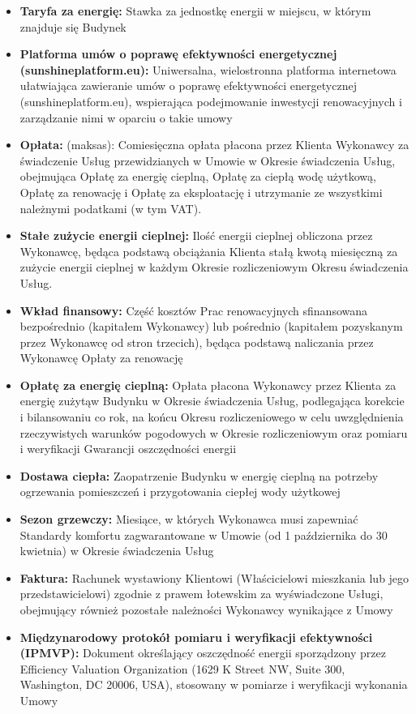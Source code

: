 \begin{multicols}{2}
\begin{itemize}[label={}]
	\item\textbf{Taryfa za energię:} Stawka za jednostkę energii w miejscu, w którym znajduje się Budynek
	\item\textbf{Platforma umów o poprawę efektywności energetycznej (sunshineplatform.eu):} Uniwersalna, wielostronna platforma internetowa ułatwiająca zawieranie umów o poprawę efektywności energetycznej (sunshineplatform.eu), wspierająca podejmowanie inwestycji renowacyjnych i zarządzanie nimi w oparciu o takie umowy
	\item\textbf{Opłata:} (maksas): Comiesięczna opłata płacona przez Klienta Wykonawcy za świadczenie Usług przewidzianych w Umowie w Okresie świadczenia Usług, obejmująca Opłatę za energię cieplną, Opłatę za ciepłą wodę użytkową, Opłatę za renowację i Opłatę za eksploatację i utrzymanie ze wszystkimi należnymi podatkami (w tym VAT).
	\item\textbf{Stałe zużycie energii cieplnej:} Ilość energii cieplnej obliczona przez Wykonawcę, będąca podstawą obciążania Klienta stałą kwotą miesięczną za zużycie energii cieplnej w każdym Okresie rozliczeniowym Okresu świadczenia Usług.
	\item\textbf{Wkład finansowy:} Część kosztów Prac renowacyjnych sfinansowana bezpośrednio (kapitałem Wykonawcy) lub pośrednio (kapitałem pozyskanym przez Wykonawcę od stron trzecich), będąca podstawą naliczania przez Wykonawcę Opłaty za renowację
	\item\textbf{Opłatę za energię cieplną:} Opłata płacona Wykonawcy przez Klienta za energię zużytąw Budynku w Okresie świadczenia Usług, podlegająca korekcie i bilansowaniu co rok, na końcu Okresu rozliczeniowego w celu uwzględnienia rzeczywistych warunków pogodowych w Okresie rozliczeniowym oraz pomiaru i weryfikacji Gwarancji oszczędności energii
	\item\textbf{Dostawa ciepła:} Zaopatrzenie Budynku w energię cieplną na potrzeby ogrzewania pomieszczeń i przygotowania ciepłej wody użytkowej
	\item\textbf{Sezon grzewczy:} Miesiące, w których Wykonawca musi zapewniać Standardy komfortu zagwarantowane w Umowie (od 1 października do 30 kwietnia) w Okresie świadczenia Usług
	\item\textbf{Faktura:} Rachunek wystawiony Klientowi (Właścicielowi mieszkania lub jego przedstawicielowi) zgodnie z prawem łotewskim za wyświadczone Usługi, obejmujący również pozostałe należności Wykonawcy wynikające z Umowy
	\item\textbf{Międzynarodowy protokół pomiaru i weryfikacji efektywności (IPMVP):} Dokument określający oszczędność energii sporządzony przez Efficiency Valuation Organization (1629 K Street NW, Suite 300, Washington, DC 20006, USA), stosowany w pomiarze i weryfikacji wykonania Umowy

\end{itemize}
\end{multicols}
